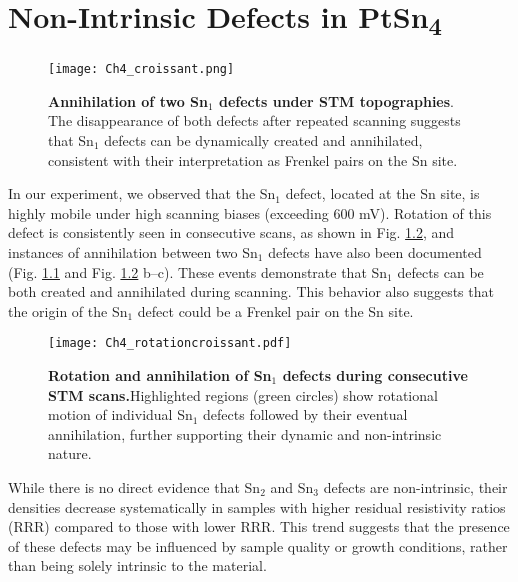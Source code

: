 \chapter{Non-Intrinsic Defects in PtSn\textsubscript{4}} \label{appen:non-intrinsic}
\begin{figure}
	\centering
	\texttt{[image: Ch4\_croissant.png]}
	\caption[\textbf{Annihilation of two Sn$_1$ defects under STM topographies}]{\textbf{Annihilation of two Sn$_1$ defects under STM topographies}. The disappearance of both defects after repeated scanning suggests that Sn$_1$ defects can be dynamically created and annihilated, consistent with their interpretation as Frenkel pairs on the Sn site.}
	\label{fig:Ch4_croissantannihilation}
\end{figure}

In our experiment, we observed that the Sn$_1$ defect, located at the Sn site, is highly mobile under high scanning biases (exceeding 600 mV). Rotation of this defect is consistently seen in consecutive scans, as shown in Fig. \ref{fig:Ch4_rotationcroissant}, and instances of annihilation between two Sn$_1$ defects have also been documented (Fig. \ref{fig:Ch4_croissantannihilation} and Fig. \ref{fig:Ch4_rotationcroissant} b–c). These events demonstrate that Sn$_1$ defects can be both created and annihilated during scanning. This behavior also suggests that the origin of the Sn$_1$ defect could be a Frenkel pair on the Sn site.



\begin{figure}
	\centering
	\texttt{[image: Ch4\_rotationcroissant.pdf]}
	\caption[\textbf{Rotation and annihilation of Sn$_1$ defects during consecutive STM scans.}]{\textbf{Rotation and annihilation of Sn$_1$ defects during consecutive STM scans.}Highlighted regions (green circles) show rotational motion of individual Sn$_1$ defects followed by their eventual annihilation, further supporting their dynamic and non-intrinsic nature.}
	\label{fig:Ch4_rotationcroissant}
\end{figure}

While there is no direct evidence that Sn$_2$ and Sn$_3$ defects are non-intrinsic, their densities decrease systematically in samples with higher residual resistivity ratios (RRR) compared to those with lower RRR. This trend suggests that the presence of these defects may be influenced by sample quality or growth conditions, rather than being solely intrinsic to the material.


